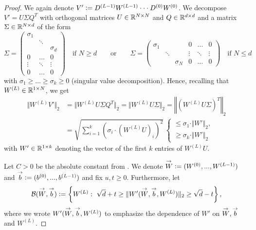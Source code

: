 \begin{proof}
We again denote $V' \mathrel{\mathop:}= D^{(L-1)}W^{(L-1)}\cdot \cdot \cdot D^{(0)}W^{(0)}$. We decompose $V' = U \Sigma Q^T$ with orthogonal matrices $U \in \mathbb{R}^{N \times N}$ and $Q \in \mathbb{R}^{d \times d}$ and a matrix $\Sigma \in \mathbb{R}^{N \times d}$ of the form 
\begin{equation*}
\Sigma = \left(\begin{matrix} \sigma_1 & & \\
				& \ddots & \\
				& & \sigma_d \\
				\hline 
				0 & \hdots & 0 \\
				\vdots & \ddots & \vdots \\
				0 & \hdots & 0  \end{matrix} \right)  \quad \text{if $N \geq d$} \qquad \text{or} \qquad \Sigma = \left(\begin{array}{ccc|ccc} \sigma_1 & &  & 0 & \hdots & 0\\
				& \ddots &  & \vdots & \ddots & \vdots \\
				& & \sigma_N & 0 & \hdots & 0
				 \end{array} \right) \quad \text{if $N \leq d$}
\end{equation*}
with $\sigma_1 \geq ... \geq \sigma_k \geq 0$ (singular value decomposition). Hence, recalling that $W^{(L)} \in \mathbb{R}^{1 \times N}$, we get
\begin{align}
	\Vert W^{(L)} V'\Vert_2  &= \Vert  W^{(L)} U \Sigma Q^T \Vert_2 = \Vert W^{(L)} U \Sigma \Vert _2 = \left\Vert \left( W^{(L)}U \Sigma\right)^T \right\Vert_2 \nonumber\\ 
	&= \sqrt{ \sum_{i= 1}^k \left(\sigma_i \cdot \left(W^{(L)}U\right)_i\right)^2}
	\label{eq: firstbound} \ 
	 \begin{cases} \leq \sigma_1 \cdot \Vert W' \Vert_2, \\  \geq \sigma_k \cdot \Vert W' \Vert_2 \end{cases}
\end{align}
with $W' \in \mathbb{R}^{1 \times k}$ denoting the vector of the first $k$ entries of $W^{(L)}U$. 

Let $C>0$ be the absolute constant from . We denote $\overset{\rightarrow}{W} \mathrel{\mathop:}= (W^{(0)}, ..., W^{(L-1)})$ and $\overset{\rightarrow}{b} \mathrel{\mathop:}= (b ^{(0)}, ..., b^{(L-1)})$ and fix $u,t \geq0$. Furthermore, let
\begin{align*}
\mathcal{B}(\overset{\rightarrow}{W}, \overset{\rightarrow}{b})\mathrel{\mathop:}= \left\{ W^{(L)}: \ \sqrt{d} + t \geq \Vert W'(\overset{\rightarrow}{W}, \overset{\rightarrow}{b}, W^{(L)}) \Vert_2 \geq \sqrt{d} - t\right\},
\end{align*}
where we wrote $W'(\overset{\rightarrow}{W}, \overset{\rightarrow}{b}, W^{(L)})$ to emphasize the dependence of $W'$ on $\overset{\rightarrow}{W}, \overset{\rightarrow}{b}$ and $W^{(L)}$.


\end{proof}
